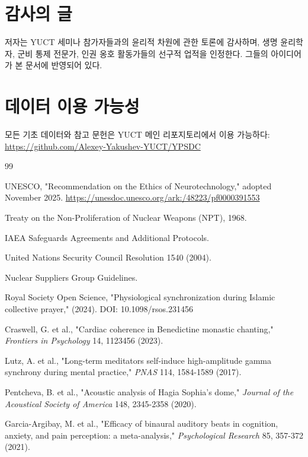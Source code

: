 \documentclass[12pt,a4paper]{article}
\theoremstyle{remark}
\begin{document}
	\section*{감사의 글}
	저자는 YUCT 세미나 참가자들과의 윤리적 차원에 관한 토론에 감사하며, 생명 윤리학자, 군비 통제 전문가, 인권 옹호 활동가들의 선구적 업적을 인정한다. 그들의 아이디어가 본 문서에 반영되어 있다.
	
	\section*{데이터 이용 가능성}
	모든 기초 데이터와 참고 문헌은 YUCT 메인 리포지토리에서 이용 가능하다: \url{https://github.com/Alexey-Yakushev-YUCT/YPSDC}
	
	\begin{thebibliography}{99}
		
		UNESCO, "Recommendation on the Ethics of Neurotechnology," adopted November 2025. 
		\url{https://unesdoc.unesco.org/ark:/48223/pf0000391553}
		
		Treaty on the Non-Proliferation of Nuclear Weapons (NPT), 1968.
		
		IAEA Safeguards Agreements and Additional Protocols.
		
		United Nations Security Council Resolution 1540 (2004).
		
		Nuclear Suppliers Group Guidelines.
		
		Royal Society Open Science, "Physiological synchronization during Islamic collective prayer," (2024). DOI: 10.1098/rsos.231456
		
		Craswell, G. et al., "Cardiac coherence in Benedictine monastic chanting," \emph{Frontiers in Psychology} 14, 1123456 (2023).
		
		Lutz, A. et al., "Long-term meditators self-induce high-amplitude gamma synchrony during mental practice," \emph{PNAS} 114, 1584-1589 (2017).
		
		Pentcheva, B. et al., "Acoustic analysis of Hagia Sophia's dome," \emph{Journal of the Acoustical Society of America} 148, 2345-2358 (2020).
		
		Garcia-Argibay, M. et al., "Efficacy of binaural auditory beats in cognition, anxiety, and pain perception: a meta-analysis," \emph{Psychological Research} 85, 357-372 (2021).
		
	\end{thebibliography}
	
\end{document}
